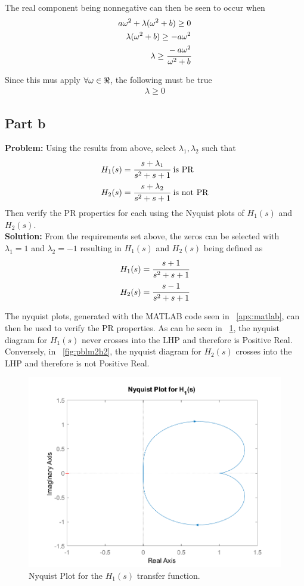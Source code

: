 \documentclass[letter]{article}
\begin{document}
The real component being nonnegative can then be seen to occur when
\begin{align}
	a \omega^2 + \lambda (\omega^2 + b) \geq 0\\
	\lambda (\omega^2 + b) \geq -a \omega^2\\
	\lambda \geq \cfrac{-a\omega^2}{\omega^2 + b}
\end{align}

Since this mus apply $\forall \omega \in \real$, the following must be true
\begin{align}
	\lambda \geq 0
\end{align}

\newpage
\subsection{Part b}
\textbf{Problem:}
Using the results from above, select $\lambda_1, \lambda_2$ such that
\begin{align}
	H_1(s) &= \cfrac{s+\lambda_1}{s^2 + s + 1} \text{ is PR}\\
	H_2(s) &= \cfrac{s+\lambda_2}{s^2 + s + 1} \text{ is not PR}
\end{align}
Then verify the PR properties for each using the Nyquist plots of $H_1(s)$ and $H_2(s)$.\\

\noindent
\textbf{Solution:}
From the requirements set above, the zeros can be selected with $\lambda_1 = 1$ and $\lambda_2 = -1$ resulting in $H_1(s)$ and $H_2(s)$ being defined as
\begin{align}
	H_1(s) &= \cfrac{s+1}{s^2 + s + 1}\\
	H_2(s) &= \cfrac{s-1}{s^2 + s + 1}
\end{align}

The nyquist plots, generated with the MATLAB code seen in \appendixname \ \ref{apx:matlab}, can then be used to verify the PR properties. As can be seen in \figurename \ \ref{fig:pblm2h1}, the nyquist diagram for $H_1(s)$ never crosses into the LHP and therefore is Positive Real. Conversely, in \figurename \ \ref{fig:pblm2h2}, the nyquist diagram for $H_2(s)$ crosses into the LHP and therefore is not Positive Real.

\begin{figure}[p]
	\centering
	\includegraphics[width=0.7\linewidth]{fig/pblm2_H1}
	\caption{Nyquist Plot for the $H_1(s)$ transfer function.}
	\label{fig:pblm2h1}
\end{figure}
\end{document}
